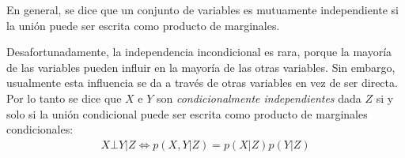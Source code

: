 		En general, se dice que un conjunto de variables es mutuamente independiente si la unión puede ser escrita como producto de marginales.
		
		Desafortunadamente, la independencia incondicional es rara, porque la mayoría de las variables pueden influir en la mayoría de las otras variables. Sin embargo, usualmente esta influencia se da a través de otras variables en vez de ser directa. Por lo tanto se dice que $X$ e $Y$ son \textit{condicionalmente independientes} dada $Z$ si y solo si la unión condicional puede ser escrita como producto de marginales condicionales:
		\begin{align}
			X \bot Y|Z \Longleftrightarrow p(X,Y|Z) = p(X|Z)p(Y|Z)
		\end{align}
	

